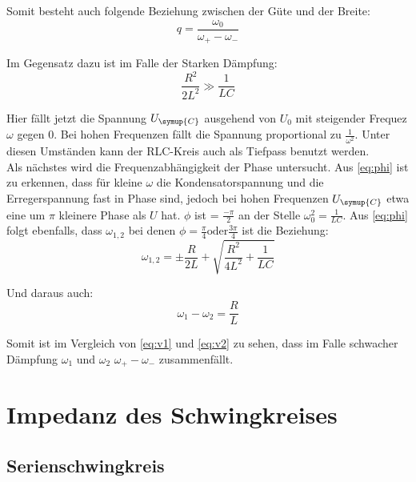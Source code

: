     \noindent Somit besteht auch folgende Beziehung zwischen der Güte und der Breite:
    \begin{equation}
        q = \frac{\omega_0}{\omega_+ - \omega_-} \nonumber
    \end{equation}

    \noindent Im Gegensatz dazu ist im Falle der Starken Dämpfung:
    \begin{equation}
        \frac{R^2}{2L^2} \gg \frac{1}{LC} \nonumber
    \end{equation}

    \noindent Hier fällt jetzt die Spannung $U_{\symup{C}}$ ausgehend von $U_0$ mit steigender Frequez $\omega$ gegen 0. Bei hohen Frequenzen fällt
    die Spannung proportional zu $\frac{1}{\omega^2}$. Unter diesen Umständen kann der RLC-Kreis auch als Tiefpass benutzt werden.
    \\
    \noindent Als nächstes wird die Frequenzabhängigkeit der Phase untersucht. Aus \ref{eq:phi} ist zu erkennen, dass für kleine $\omega$ die 
    Kondensatorspannung und die Erregerspannung fast in Phase sind, jedoch bei hohen Frequenzen $U_{\symup{C}}$ etwa eine um $\pi$ 
    kleinere Phase als $U$ hat. $\phi$ ist = $\frac{-\pi}{2}$ an der Stelle $\omega^2_0 = \frac{1}{LC}$.
    Aus \ref{eq:phi} folgt ebenfalls, dass $\omega_{1,2}$ bei denen $\phi= \frac{\pi}{4} \text{oder} \frac{3\pi}{4}$ ist die Beziehung:
    \begin{equation}
        \omega_{1,2} = \pm  \frac{R}{2L} + \sqrt{\frac{R^2}{4L^2}+ \frac{1}{LC}} \nonumber
    \end{equation}

    \noindent Und daraus auch:
    \begin{equation}
        \omega_1 - \omega_2 = \frac{R}{L} 
        \label{eq:v2}
    \end{equation}

    \noindent Somit ist im Vergleich von \ref{eq:v1} und \ref{eq:v2} zu sehen, dass im Falle schwacher Dämpfung $\omega_1$ und $\omega_2$ 
    $\omega_+ - \omega_-$ zusammenfällt.


    \section{Impedanz des Schwingkreises}


        \subsection{Serienschwingkreis}

